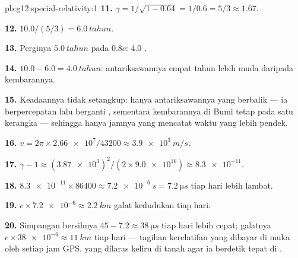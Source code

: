 \begin{solution}{pb:g12:special-relativity:1}
\textbf{11.} $\gamma = 1/\sqrt{1 - 0.64} = 1/0.6 = 5/3 \approx 1.67$.

\textbf{12.} $10.0/(5/3) = \qty{6.0}{tahun}$.

\textbf{13.} Perginya $\qty{5.0}{tahun}$ pada $0.8c$: $4.0$ .

\textbf{14.} $10.0 - 6.0 = \qty{4.0}{tahun}$: antariksawannya empat
tahun lebih muda daripada kembarannya.

\textbf{15.} Keadaannya tidak setangkup: hanya antariksawannya yang
berbalik --- ia berpercepatan lalu berganti , sementara kembarannya di
Bumi tetap pada satu kerangka --- sehingga hanya jamnya yang mencatat waktu yang lebih pendek.

\textbf{16.} $v = 2\pi \times \num{2.66e7}/\num{43200} \approx
\qty{3.9e3}{m/s}$.

\textbf{17.} $\gamma - 1 \approx (\num{3.87e3})^2/(2 \times
\num{9.0e16}) \approx \num{8.3e-11}$.

\textbf{18.} $\num{8.3e-11} \times \num{86400} \approx \qty{7.2e-6}{s}
= \qty{7.2}{\micro s}$ tiap hari lebih lambat.

\textbf{19.} $c \times \num{7.2e-6} \approx \qty{2.2}{km}$ galat kedudukan
tiap hari.

\textbf{20.} Simpangan bersihnya $45 - 7.2 \approx \qty{38}{\micro s}$ tiap hari
lebih cepat; galatnya $c \times \num{38e-6} \approx \qty{11}{km}$ tiap hari ---
tagihan kerelatifan yang dibayar di muka oleh setiap jam GPS, yang dilaras keliru di
tanah agar ia berdetik tepat di .
\end{solution}
